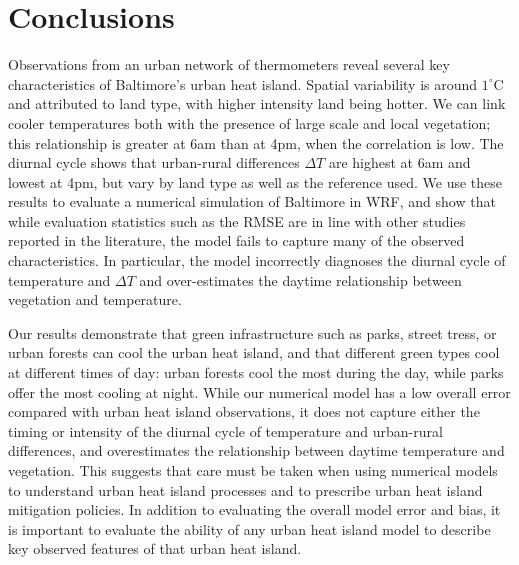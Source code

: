 \documentclass[draft,linenumbers]{agujournal}
\begin{document}
\section{Conclusions}\label{sec:conclusions}
Observations from an urban network of thermometers reveal several key characteristics of Baltimore's urban heat island. Spatial variability is around $1^\circ$C and attributed to land type, with higher intensity land being hotter. We can link cooler temperatures both with the presence of large scale and local vegetation; this relationship is greater at 6am than at 4pm, when the correlation is low. The diurnal cycle shows that urban-rural differences $\Delta T$ are highest at 6am and lowest at 4pm, but vary by land type as well as the reference used. We use these results to evaluate a numerical simulation of Baltimore in WRF, and show that while evaluation statistics such as the RMSE are in line with other studies reported in the literature, the model fails to capture many of the observed characteristics. In particular, the model incorrectly diagnoses the diurnal cycle of temperature and $\Delta T$ and over-estimates the daytime relationship between vegetation and temperature. 

Our results demonstrate that green infrastructure such as parks, street tress, or urban forests can cool the urban heat island, and that different green types cool at different times of day: urban forests cool the most during the day, while parks offer the most cooling at night. While our numerical model has a low overall error compared with urban heat island observations, it does not capture either the timing or intensity of the diurnal cycle of temperature and urban-rural differences, and overestimates the relationship between daytime temperature and vegetation. This suggests that care must be taken when using numerical models to understand urban heat island processes and to prescribe urban heat island mitigation policies. In addition to evaluating the overall model error and bias, it is important to evaluate the ability of any urban heat island model to describe key observed features of that urban heat island. 
\end{document}

